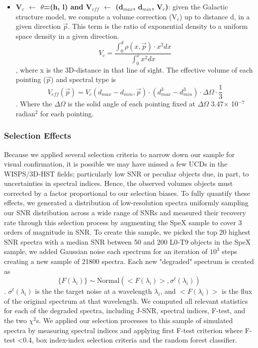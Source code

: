 \documentclass[manuscript]{aastex63}
\begin{document}
\begin{itemize}
\item \textbf{ V$_c$ $\leftarrow$ $\theta$=(h, l) and  V$_{eff}$ $\leftarrow$ (d$_{max}$, d$_{min}$, V$_c$)}: given the Galactic structure model, we compute a volume correction (V$_c$) up to distance d, in a given direction $\vec{p}$. This term is the ratio of exponential density to a uniform space density in a given direction. \begin{equation} V_c= \frac{\int_0 ^d\rho(x, \vec{p} ) \cdot x^2 dx} {\int_0 ^x x^2 dx}
\end{equation}, where  x is the 3D-distance in that line of sight. The effective volume of each pointing ($\vec{p}$) and spectral type is \begin{equation}
V_{eff} (\vec{p})= V_c(d_{max}-d_{min}, \vec{p}) \cdot (d_{max}^3-d_{min}^3) \cdot \Delta \Omega  \cdot \frac{1}{3}\end{equation}. Where the $\Delta \Omega$ is the solid angle of each pointing fixed at $\Delta \Omega$ 3.47$\times$ 10$^{-7}$radian$^2$ for each pointing.

\end{itemize}

\subsubsection{Selection Effects}

Because we applied several selection criteria to narrow down our sample for visual confirmation, it is possible we may have missed a few UCDs in the WISPS/3D-HST fields; particularly low SNR or peculiar objects due, in part, to uncertainties in spectral indices. Hence, the observed volumes objects must corrected by a factor proportional to our selection biases. To fully quantify these effects, we generated a distribution of low-resolution spectra uniformly sampling our SNR distribution across a wide range of SNRs and measured their recovery rate through this selection process by augmenting the SpeX sample to cover 3 orders of magnitude in SNR. To create this sample, we picked the top 20 highest SNR spectra with a median SNR between 50 and 200 L0-T9 objects in the SpeX sample, we added Gaussian noise each spectrum for an iteration of $10^3$ steps creating a new sample of 21800 spectra. Each new "degraded" spectrum is created as \begin{equation} \{F(\lambda _i)\} \sim \text{Normal} (<F(\lambda_i)>, \sigma^t(\lambda_i )) \end{equation}. $\sigma^t(\lambda_i )$ is the the target noise at a wavelength $\lambda_i$, and $<F(\lambda_i )>$ is the flux of the original spectrum at that wavelength. We computed all relevant statistics for each of the degraded spectra, including J-SNR, spectral indices, F-test, and the two $\chi^2$s. We applied our selection processes to this sample of simulated spectra by measuring spectral indices and applying first F-test criterion where F-test \textless 0.4, box index-index selection criteria and the random forest classifier. 
\end{document}
